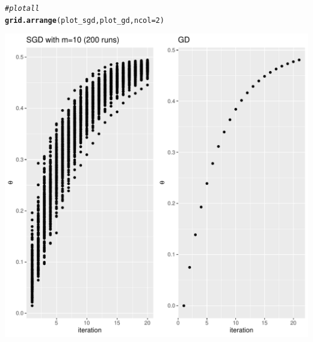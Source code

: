 \documentclass[a4paper]{article}
\makeatletter
\newcommand{\hlnum}[1]{\textcolor[rgb]{0.686,0.059,0.569}{#1}}%
\newcommand{\hlcom}[1]{\textcolor[rgb]{0.678,0.584,0.686}{\textit{#1}}}%
\newcommand{\hlstd}[1]{\textcolor[rgb]{0.345,0.345,0.345}{#1}}%
\newcommand{\hlkwc}[1]{\textcolor[rgb]{0.333,0.667,0.333}{#1}}%
\newcommand{\hlkwd}[1]{\textcolor[rgb]{0.737,0.353,0.396}{\textbf{#1}}}%
\newenvironment{kframe}{%
 \def\at@end@of@kframe{}%
 \ifinner\ifhmode%
  \def\at@end@of@kframe{\end{minipage}}%
  \begin{minipage}{\columnwidth}%
 \fi\fi%
 \def\FrameCommand##1{\hskip\@totalleftmargin \hskip-\fboxsep
 \colorbox{shadecolor}{##1}\hskip-\fboxsep
     \hskip-\linewidth \hskip-\@totalleftmargin \hskip\columnwidth}%
 \MakeFramed {\advance\hsize-\width
   \@totalleftmargin\z@ \linewidth\hsize
   \@setminipage}}%
 {\par\unskip\endMakeFramed%
 \at@end@of@kframe}
\newenvironment{knitrout}{}{} %
\makeatother
\begin{document}
{\begin{enumerate}
\begin{knitrout}
\begin{kframe}
\begin{alltt}
\hlcom{# plot all}
\hlkwd{grid.arrange}\hlstd{(plot_sgd, plot_gd,} \hlkwc{ncol}\hlstd{=}\hlnum{2}\hlstd{)}
\end{alltt}
\end{kframe}
\includegraphics[width=0.5\linewidth]{figure/mv-plot_compare-1} 
\end{knitrout}
\end{enumerate}
}
\end{document}
